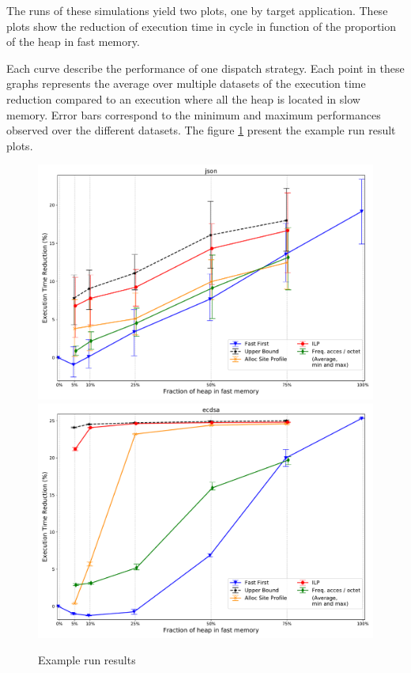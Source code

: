 \documentclass[10 pt]{article}
\begin{document}
The runs of these simulations yield two plots, one by target application.
These plots show the reduction of execution time in cycle in function of the proportion of the heap in fast memory.

Each curve describe the performance of one dispatch strategy.
Each point in these graphs represents the average over multiple datasets of the execution time reduction compared to an execution where all the heap is located in slow memory.
Error bars correspond to the minimum and maximum performances observed over the different datasets.
The figure \ref{result_plots} present the example run result plots.

\begin{figure}[h]
  \centering
  \includegraphics[width=.6\textwidth]{img/json_parser_A(0-1-2-3-4-5-6)D(0-1-2-3)S(ff-ilp-freq-prof).pdf}
  \includegraphics[width=.6\textwidth]{img/ecdsa_A(0-1-2-3-4-5-6)D(0-1-2-3)S(ff-ilp-freq-prof).pdf}
\caption{Example run results}
\label{result_plots}
\end{figure}
\end{document}
